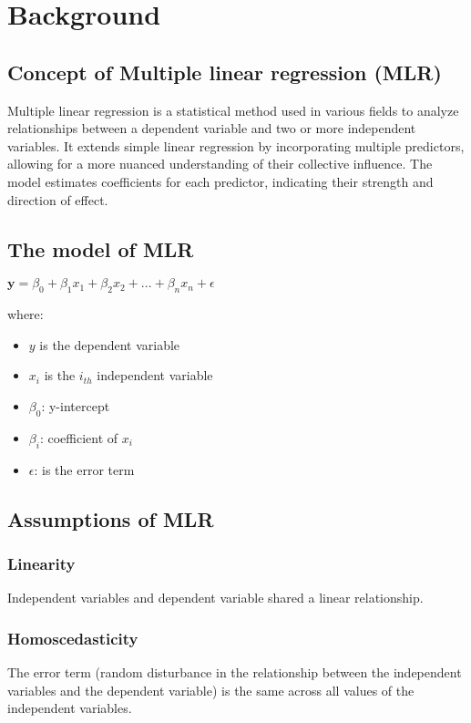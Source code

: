 \section{Background}
\subsection{Concept of Multiple linear regression (MLR)}
\tab Multiple linear regression is a statistical method used in various fields to analyze relationships between a dependent variable and two or more independent variables. It extends simple linear regression by incorporating multiple predictors, allowing for a more nuanced understanding of their collective 
influence. The model estimates coefficients for each predictor, indicating their strength and direction of effect. 

\subsection{The model of MLR}
\begin{center}
    $\textbf{y} = \beta_0 + \beta_1 x_1 + \beta_2 x_2 + ... + \beta_n x_n + \epsilon$
\end{center}
\tab where:
\begin{itemize}
    \item $y$ is the dependent variable
    \item $x_i$ is the $i_{th}$ independent variable
    \item $\beta_0$: y-intercept
    \item $\beta_{i}$: coefficient of $x_i$
    \item $\epsilon$: is the error term
\end{itemize}
\subsection{Assumptions of MLR}
\subsubsection{Linearity}
\tab Independent variables and dependent variable shared a linear relationship. 
\subsubsection{Homoscedasticity}

\tab The error term (random disturbance in the 
relationship between the independent variables and the dependent variable) is the same across all values of the independent variables. 

